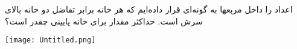 اعداد را داخل مربعها به گونه‌‌ای قرار داده‌ایم که هر خانه برابر تفاضل دو خانه بالای سرش است.
حداکثر مقدار برای خانه پایینی چقدر است؟
\begin{center}
    \texttt{[image: Untitled.png]}
\end{center}
